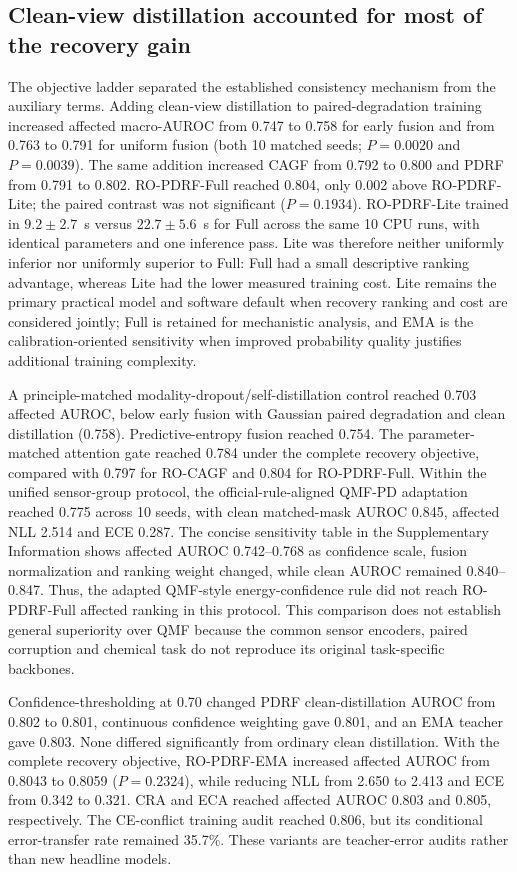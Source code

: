 \documentclass[11pt]{article}
\begin{document}
\subsection{Clean-view distillation accounted for most of the recovery gain}

The objective ladder separated the established consistency mechanism from the auxiliary terms. Adding clean-view distillation to paired-degradation training increased affected macro-AUROC from 0.747 to 0.758 for early fusion and from 0.763 to 0.791 for uniform fusion (both 10 matched seeds; $P=0.0020$ and $P=0.0039$). The same addition increased CAGF from 0.792 to 0.800 and PDRF from 0.791 to 0.802. RO-PDRF-Full reached 0.804, only 0.002 above RO-PDRF-Lite; the paired contrast was not significant ($P=0.1934$). RO-PDRF-Lite trained in $9.2\pm2.7$~s versus $22.7\pm5.6$~s for Full across the same 10 CPU runs, with identical parameters and one inference pass. Lite was therefore neither uniformly inferior nor uniformly superior to Full: Full had a small descriptive ranking advantage, whereas Lite had the lower measured training cost. Lite remains the primary practical model and software default when recovery ranking and cost are considered jointly; Full is retained for mechanistic analysis, and EMA is the calibration-oriented sensitivity when improved probability quality justifies additional training complexity.

A principle-matched modality-dropout/self-distillation control reached 0.703 affected AUROC, below early fusion with Gaussian paired degradation and clean distillation (0.758). Predictive-entropy fusion reached 0.754. The parameter-matched attention gate reached 0.784 under the complete recovery objective, compared with 0.797 for RO-CAGF and 0.804 for RO-PDRF-Full. Within the unified sensor-group protocol, the official-rule-aligned QMF-PD adaptation reached 0.775 across 10 seeds, with clean matched-mask AUROC 0.845, affected NLL 2.514 and ECE 0.287. The concise sensitivity table in the Supplementary Information shows affected AUROC 0.742--0.768 as confidence scale, fusion normalization and ranking weight changed, while clean AUROC remained 0.840--0.847. Thus, the adapted QMF-style energy-confidence rule did not reach RO-PDRF-Full affected ranking in this protocol. This comparison does not establish general superiority over QMF because the common sensor encoders, paired corruption and chemical task do not reproduce its original task-specific backbones.

Confidence-thresholding at 0.70 changed PDRF clean-distillation AUROC from 0.802 to 0.801, continuous confidence weighting gave 0.801, and an EMA teacher gave 0.803. None differed significantly from ordinary clean distillation. With the complete recovery objective, RO-PDRF-EMA increased affected AUROC from 0.8043 to 0.8059 ($P=0.2324$), while reducing NLL from 2.650 to 2.413 and ECE from 0.342 to 0.321. CRA and ECA reached affected AUROC 0.803 and 0.805, respectively. The CE-conflict training audit reached 0.806, but its conditional error-transfer rate remained 35.7\%. These variants are teacher-error audits rather than new headline models.
\end{document}
